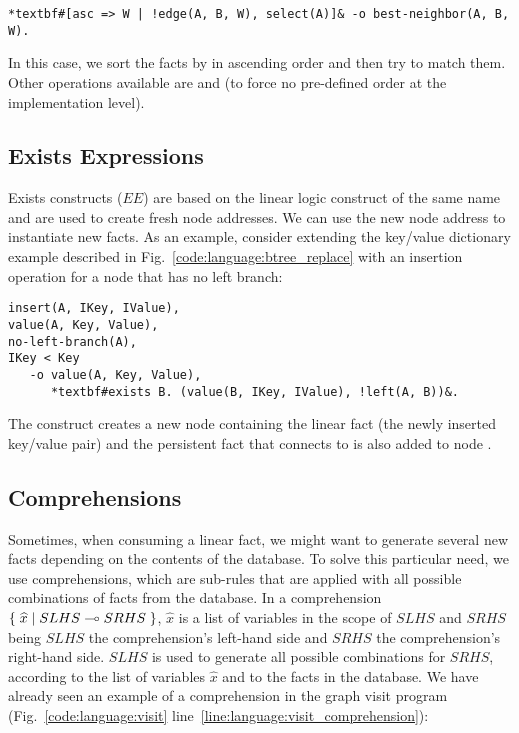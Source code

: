 \begin{Verbatim}[fontsize=\codesize,commandchars=\*\#\&]
*textbf#[asc => W | !edge(A, B, W), select(A)]& -o best-neighbor(A, B, W).
\end{Verbatim}

In this case, we sort the  facts by  in ascending order
and then try to match them. Other operations available are  and
 (to force no pre-defined order at the implementation level).

\subsection{Exists Expressions}\label{section:language:expressions}

Exists constructs ($EE$) are based on the linear logic construct of the same
name and are used to create fresh node addresses. We can use the new node address to
instantiate new facts. As an example, consider extending the
key/value dictionary example described in Fig.~\ref{code:language:btree_replace}
with an insertion operation for a node that has no left branch:

\begin{Verbatim}[fontsize=\codesize,commandchars=\*\#\&]
insert(A, IKey, IValue),
value(A, Key, Value),
no-left-branch(A),
IKey < Key
   -o value(A, Key, Value),
      *textbf#exists B. (value(B, IKey, IValue), !left(A, B))&.
\end{Verbatim}

The  construct creates a new node  containing the linear fact
 (the newly inserted key/value pair) and the
persistent fact  that connects  to  is also
added to node .

\subsection{Comprehensions}

Sometimes, when consuming a linear fact, we might want to generate several new
facts depending on the contents of the database. To solve this particular need,
we use comprehensions, which are sub-rules that are applied with all possible
combinations of facts from the database. In a comprehension
$\{ \; \widehat{x} \; | \; SLHS \multimap SRHS \; \}$, $\widehat{x}$ is a list of variables
in the scope of $SLHS$ and $SRHS$ being $SLHS$ the comprehension's left-hand
side and $SRHS$ the comprehension's right-hand side. $SLHS$ is used to generate
all possible combinations for $SRHS$, according to the list of variables
$\hat{x}$ and to the facts in the database. We have already seen an example of a
comprehension in the graph visit program (Fig.~\ref{code:language:visit}
line~\ref{line:language:visit_comprehension}):

